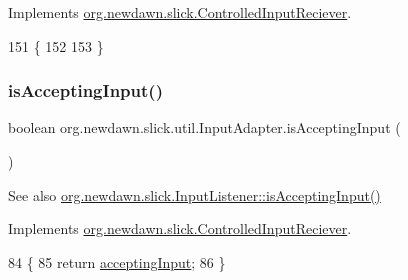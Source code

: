 Implements \mbox{\hyperlink{interfaceorg_1_1newdawn_1_1slick_1_1_controlled_input_reciever_a718de21e9cd22f4c48ee87b5b8b32ed6}{org.\+newdawn.\+slick.\+Controlled\+Input\+Reciever}}.


\begin{DoxyCode}
151                                \{
152         
153     \}
\end{DoxyCode}
\mbox{\label{classorg_1_1newdawn_1_1slick_1_1util_1_1_input_adapter_a8f20e7fc464c8f8f7a676b041e691765}} 
\subsubsection{\texorpdfstring{is\+Accepting\+Input()}{isAcceptingInput()}}
{\footnotesize\ttfamily boolean org.\+newdawn.\+slick.\+util.\+Input\+Adapter.\+is\+Accepting\+Input (\begin{DoxyParamCaption}{ }\end{DoxyParamCaption})\hspace{0.3cm}{\ttfamily [inline]}}

\begin{DoxySeeAlso}{See also}
\mbox{\hyperlink{interfaceorg_1_1newdawn_1_1slick_1_1_controlled_input_reciever_a380186fb0c34c11c212b72fae8186dc7}{org.\+newdawn.\+slick.\+Input\+Listener\+::is\+Accepting\+Input()}} 
\end{DoxySeeAlso}


Implements \mbox{\hyperlink{interfaceorg_1_1newdawn_1_1slick_1_1_controlled_input_reciever_a380186fb0c34c11c212b72fae8186dc7}{org.\+newdawn.\+slick.\+Controlled\+Input\+Reciever}}.


\begin{DoxyCode}
84                                       \{
85         \textcolor{keywordflow}{return} \mbox{\hyperlink{classorg_1_1newdawn_1_1slick_1_1util_1_1_input_adapter_a29236557cf2412c8f843886d2453c650}{acceptingInput}};
86     \}
\end{DoxyCode}
\mbox{\label{classorg_1_1newdawn_1_1slick_1_1util_1_1_input_adapter_a3178218deea8aa330edf5e5c3699addc}} 
